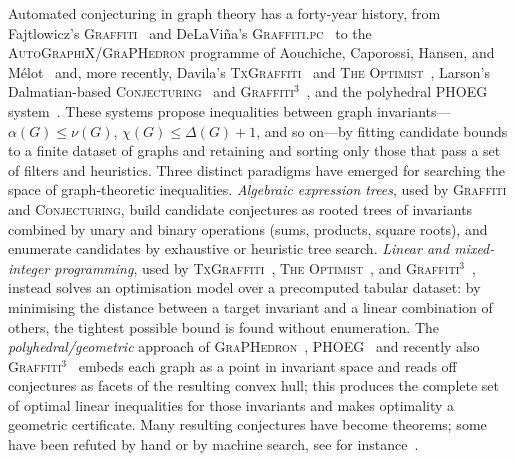 \documentclass[]{ceurart}
\begin{document}
Automated conjecturing in graph theory has a forty-year history, from
Fajtlowicz's \textsc{Graffiti}~\cite{fajtlowicz1988conjectures,wiki2026graffiti,larson2002intelligent} and
DeLaVi\~na's \textsc{Graffiti.pc}~\cite{delavina2002graffitipc,delavina2005history}
to the \textsc{AutoGraphiX}/\textsc{GraPHedron} programme of Aouchiche,
Caporossi, Hansen, and M\'elot~\cite{aouchiche2009variable,caporossi2004graphedron,melot2008facet} and,
more recently, Davila's \textsc{TxGraffiti}~\cite{davila2024automated,caro2022txgraffiti}
and \textsc{The Optimist}~\cite{davila2024optimist}, Larson's Dalmatian-based
\textsc{Conjecturing}~\cite{larson2016dalmatian,larson2017automated} and
\textsc{Graffiti}$^3$~\cite{davila2026graffiti3}, and the polyhedral
\textsc{PHOEG} system~\cite{bonte2026phoeg}. These systems propose inequalities
between graph invariants---$\alpha(G)\le\nu(G)$, $\chi(G)\le\Delta(G)+1$, and
so on---by fitting candidate bounds to a finite dataset of graphs and retaining and sorting only those that pass a set of filters and heuristics. Three distinct paradigms have emerged for searching the space of graph-theoretic
inequalities. \emph{Algebraic expression trees}, used by \textsc{Graffiti} and \textsc{Conjecturing}, build
candidate conjectures as rooted trees of invariants combined by unary and binary
operations (sums, products, square roots), and enumerate candidates by
exhaustive or heuristic tree search. \emph{Linear and mixed-integer programming},
used by \textsc{TxGraffiti}~\cite{davila2024automated,caro2022txgraffiti},
\textsc{The Optimist}~\cite{davila2024optimist}, and
\textsc{Graffiti}$^3$~\cite{davila2026graffiti3}, instead solves an
optimisation model over a precomputed tabular dataset: by minimising the
distance between a target invariant and a linear combination of others, the
tightest possible bound is found without enumeration. The
\emph{polyhedral/geometric} approach of \textsc{GraPHedron}~\cite{melot2008facet,caporossi2004graphedron}, 
\textsc{PHOEG}~\cite{bonte2026phoeg,christophe2008linear} and recently also \textsc{Graffiti}$^3$~\cite{davila2026graffiti3} embeds each graph as a
point in invariant space and reads off conjectures as facets of the resulting
convex hull; this produces the complete set of optimal linear
inequalities for those invariants and makes optimality a geometric certificate. Many resulting conjectures 
have become theorems; some have been refuted by hand or by machine
search, see for instance~\cite{brewster1995computational,larson2017automated,jooken2025computer}.
\end{document}

